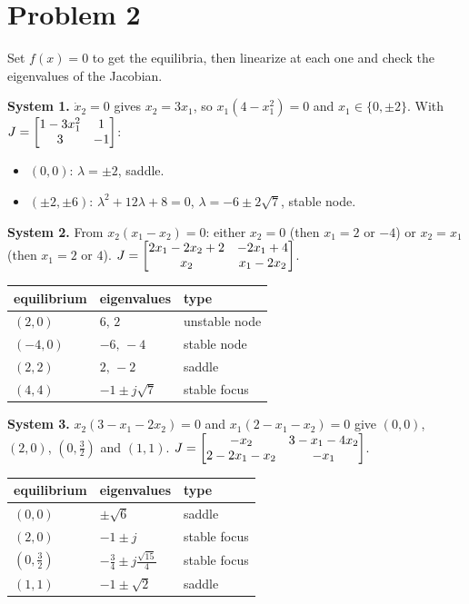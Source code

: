 \section*{Problem 2}

Set $f(x)=0$ to get the equilibria, then linearize at each one and check the eigenvalues of the Jacobian.

\textbf{System 1.} $\dot x_2=0$ gives $x_2=3x_1$, so $x_1(4-x_1^2)=0$ and $x_1\in\{0,\pm2\}$. With $J=\begin{bmatrix}1-3x_1^2&1\\3&-1\end{bmatrix}$:
\begin{itemize}
\item $(0,0)$: $\lambda=\pm2$, saddle.
\item $(\pm2,\pm6)$: $\lambda^2+12\lambda+8=0$, $\lambda=-6\pm2\sqrt7$, stable node.
\end{itemize}

\textbf{System 2.} From $x_2(x_1-x_2)=0$: either $x_2=0$ (then $x_1=2$ or $-4$) or $x_2=x_1$ (then $x_1=2$ or $4$). $J=\begin{bmatrix}2x_1-2x_2+2&-2x_1+4\\x_2&x_1-2x_2\end{bmatrix}$.
\begin{center}
\begin{tabular}{lll}
\toprule
equilibrium & eigenvalues & type\\
\midrule
$(2,0)$ & $6,\,2$ & unstable node\\
$(-4,0)$ & $-6,\,-4$ & stable node\\
$(2,2)$ & $2,\,-2$ & saddle\\
$(4,4)$ & $-1\pm j\sqrt7$ & stable focus\\
\bottomrule
\end{tabular}
\end{center}

\textbf{System 3.} $x_2(3-x_1-2x_2)=0$ and $x_1(2-x_1-x_2)=0$ give $(0,0)$, $(2,0)$, $(0,\tfrac32)$ and $(1,1)$. $J=\begin{bmatrix}-x_2&3-x_1-4x_2\\2-2x_1-x_2&-x_1\end{bmatrix}$.
\begin{center}
\begin{tabular}{lll}
\toprule
equilibrium & eigenvalues & type\\
\midrule
$(0,0)$ & $\pm\sqrt6$ & saddle\\
$(2,0)$ & $-1\pm j$ & stable focus\\
$(0,\tfrac32)$ & $-\tfrac34\pm j\tfrac{\sqrt{15}}{4}$ & stable focus\\
$(1,1)$ & $-1\pm\sqrt2$ & saddle\\
\bottomrule
\end{tabular}
\end{center}

